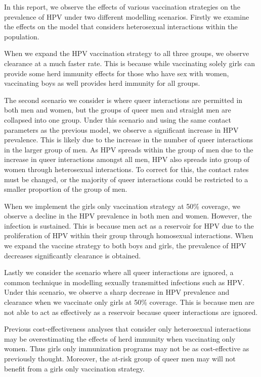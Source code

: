 \documentclass[12pt]{article}
\begin{document}
In this report, we observe the effects of various vaccination strategies on the prevalence of HPV under two different modelling scenarios.  Firstly we examine the effects on the model that considers heterosexual interactions within the population.  

 
When we expand the HPV vaccination strategy to all three groups, we observe clearance at a much faster rate.  This is because while vaccinating solely girls can provide some herd immunity effects for those who have sex with women, vaccinating boys as well provides herd immunity for all groups.  

The second scenario we consider is where queer interactions are permitted in both men and women, but the groups of queer men and straight men are collapsed into one group.  Under this scenario and using the same contact parameters as the previous model, we observe a significant increase in HPV prevalence.  This is likely due to the increase in the number of queer interactions in the larger group of men.  As HPV spreads within the group of men due to the increase in queer interactions amongst all men, HPV also spreads into group of women through heterosexual interactions.  To correct for this, the contact rates must be changed, or the majority of queer interactions could be restricted to a smaller proportion of the group of men. 

When we implement the girls only vaccination strategy at 50\% coverage, we observe a decline in the HPV prevalence in both men and women.  However, the infection is sustained.  This is because men act as a reservoir for HPV due to the proliferation of HPV within their group through homosexual interactions.  When we expand the vaccine strategy to both boys and girls, the prevalence of HPV decreases significantly clearance is obtained. 

Lastly we consider the scenario where all queer interactions are ignored, a common technique in modelling sexually transmitted infections such as HPV.  Under this scenario, we observe a sharp decrease in HPV prevalence and clearance when we vaccinate only girls at 50\% coverage.  This is because men are not able to act as effectively as a reservoir because queer interactions are ignored.  

Previous cost-effectiveness analyses that consider only heterosexual interactions may be overestimating the effects of herd immunity when vaccinating only women.  Thus girls only immunization programs may not be as cost-effective as previously thought.  Moreover, the at-risk group of queer men may will not benefit from a girls only vaccination strategy. 
\end{document}
